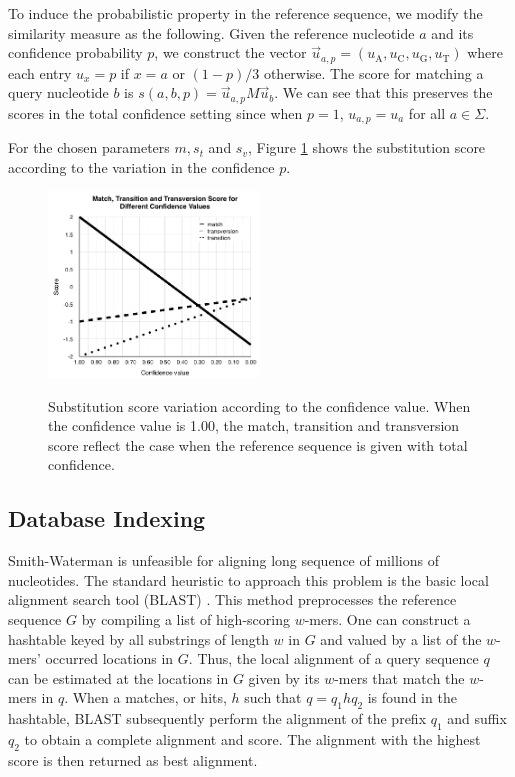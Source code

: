 \documentclass{article}
\begin{document}
To induce the probabilistic property in the reference sequence, we modify the similarity measure as the following. Given the reference nucleotide $a$ and its confidence probability $p$, we construct the vector $\vec{u}_{a,p} = (u_{\mbox{A}}, u_{\mbox{C}}, u_{\mbox{G}}, u_{\mbox{T}})$ where each entry $u_x = p$ if $x=a$ or $(1-p)/3$ otherwise. The score for matching a query nucleotide $b$ is $s(a,b,p) = \vec{u}_{a,p}M\vec{u}_b$. We can see that this preserves the scores in the total confidence setting since when $p=1$, $u_{a,p} = u_a$ for all $a \in \Sigma$. 

For the chosen parameters $m, s_t$ and $s_v$, Figure \ref{figure:score_graphs} shows the substitution score according to the variation in the confidence $p$. 

\begin{figure}[tbp]
\begin{center}
\caption{Substitution score variation according to the confidence value. When the confidence value is 1.00, the match, transition and transversion score reflect the case when the reference sequence is given with total confidence.}
   \includegraphics[width=0.50\textwidth]{score_graph}
\label{figure:score_graphs}
\end{center}
\end{figure}

\subsection{Database Indexing}

Smith-Waterman is unfeasible for aligning long sequence of millions of nucleotides. The standard heuristic to approach this problem is the basic local alignment search tool (BLAST) \cite{blast}. This method preprocesses the reference sequence $G$ by compiling a list of high-scoring $w$-mers. One can construct a hashtable keyed by all substrings of length $w$ in $G$ and valued by a list of the $w$-mers' occurred locations in $G$. Thus, the local alignment of a query sequence $q$ can be estimated at the locations in $G$ given by its $w$-mers that match the $w$-mers in $q$. When a matches, or hits, $h$ such that $q = q_1hq_2$ is found in the hashtable, BLAST subsequently perform the alignment of the prefix $q_1$ and suffix $q_2$ to obtain a complete alignment and score. The alignment with the highest score is then returned as best alignment.
\end{document}

